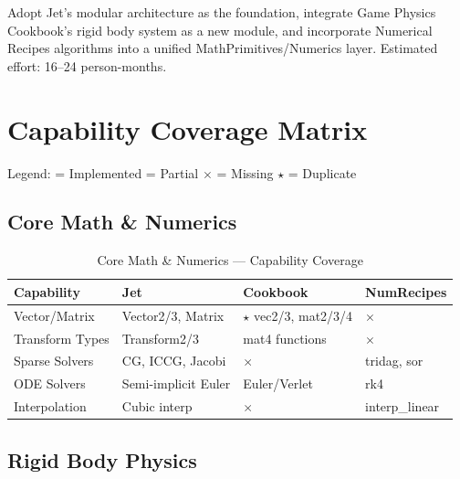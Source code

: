 \documentclass[11pt]{article}
\newcommand{\Impl}{\checkmark}
\newcommand{\Part}{\textopenbullet}
\newcommand{\Miss}{$\times$}
\newcommand{\Dup}{$\star$}
\begin{document}
Adopt Jet's modular architecture as the foundation, integrate Game Physics Cookbook's rigid body system as a new module, and incorporate Numerical Recipes algorithms into a unified MathPrimitives/Numerics layer. Estimated effort: 16--24 person-months.

\section{Capability Coverage Matrix}

Legend: \Impl{} = Implemented \quad \Part{} = Partial \quad \Miss{} = Missing \quad \Dup{} = Duplicate

\subsection{Core Math \& Numerics}

\begin{table}[htbp]
\centering
\small
\caption{Core Math \& Numerics --- Capability Coverage}
\begin{tabularx}{\textwidth}{@{} p{3cm} X X X @{}}
\toprule
\textbf{Capability} & \textbf{Jet} & \textbf{Cookbook} & \textbf{NumRecipes} \\
\midrule
Vector/Matrix & \Impl{} Vector2/3, Matrix & \Dup{} vec2/3, mat2/3/4 & \Miss{} \\
Transform Types & \Impl{} Transform2/3 & \Part{} mat4 functions & \Miss{} \\
Sparse Solvers & \Impl{} CG, ICCG, Jacobi & \Miss{} & \Part{} tridag, sor \\
ODE Solvers & \Part{} Semi-implicit Euler & \Part{} Euler/Verlet & \Impl{} rk4 \\
Interpolation & \Impl{} Cubic interp & \Miss{} & \Impl{} interp\_linear \\
\bottomrule
\end{tabularx}
\end{table}

\subsection{Rigid Body Physics}
\end{document}
